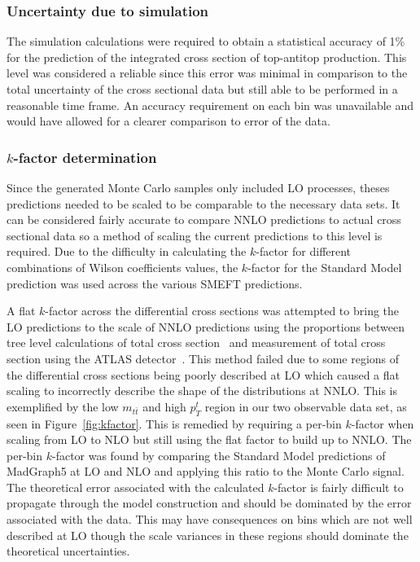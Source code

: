 \documentclass[a4paper]{article}
\begin{document}
\subsubsection{Uncertainty due to simulation}

The simulation calculations were required to obtain a statistical accuracy of 1\% for the prediction of the integrated cross section of top-antitop production.
This level was considered a reliable since this error was minimal in comparison to the total uncertainty of the cross sectional data but still able to be performed in a reasonable time frame.
An accuracy requirement on each bin was unavailable and would have allowed for a clearer comparison to error of the data.

\subsubsection{\texorpdfstring{$k$}{k}-factor determination}
Since the generated Monte Carlo samples only included LO processes, theses predictions needed to be scaled to be comparable to the necessary data sets.
It can be considered fairly accurate to compare NNLO predictions to actual cross sectional data so a method of scaling the current predictions to this level is required.
Due to the difficulty in calculating the $k$-factor for different combinations of Wilson coefficients values, the $k$-factor for the Standard Model prediction was used across the various SMEFT predictions.

A flat $k$-factor across the differential cross sections was attempted to bring the LO predictions to the scale of NNLO predictions using the proportions between tree level calculations of total cross section~\cite{Alwall_2014} and measurement of total cross section using the ATLAS detector~\cite{ATLAS:2019hxz}.
This method failed due to some regions of the differential cross sections being poorly described at LO which caused a flat scaling to incorrectly describe the shape of the distributions at NNLO.
This is exemplified by the low $m_{t\bar{t}}$ and high $p_{T}^{t}$ region in our two observable data set, as seen in Figure~\ref{fig:kfactor}.
This is remedied by requiring a per-bin $k$-factor when scaling from LO to NLO but still using the flat factor to build up to NNLO.
The per-bin $k$-factor was found by comparing the Standard Model predictions of MadGraph5 at LO and NLO and applying this ratio to the Monte Carlo signal.
The theoretical error associated with the calculated $k$-factor is fairly difficult to propagate through the model construction and should be dominated by the error associated with the data.
This may have consequences on bins which are not well described at LO though the scale variances in these regions should dominate the theoretical uncertainties.
\end{document}
